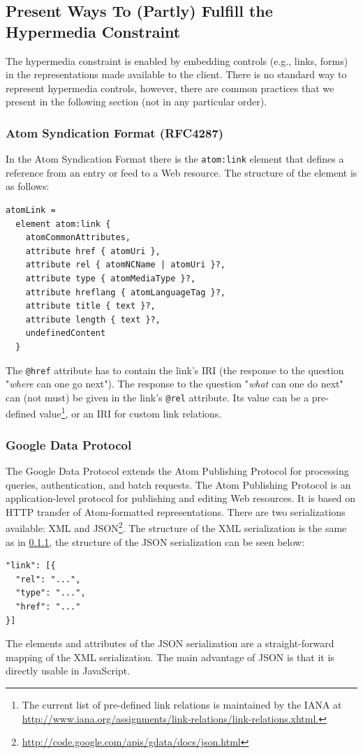 \documentclass{acm_proc_article-sp}
\begin{document}
\subsection{Present Ways To (Partly) Fulfill the Hypermedia Constraint}\label{sec:currenthateoas}
The hypermedia constraint is enabled by embedding controls (e.g., links, forms) in the representations made available to the client. There is no standard way to represent hypermedia controls, however, there are common practices that we present in the following section (not in any particular order).

\subsubsection{Atom Syndication Format (RFC4287)}\label{sec:atom}
In the Atom Syndication Format \cite{Atom:Synd} there is the \texttt{atom:link} element that defines a reference from an entry or feed to a Web resource. The structure of the element is as follows:
\begin{verbatim}
atomLink =
  element atom:link {
    atomCommonAttributes,
    attribute href { atomUri },
    attribute rel { atomNCName | atomUri }?,
    attribute type { atomMediaType }?,
    attribute hreflang { atomLanguageTag }?,
    attribute title { text }?,
    attribute length { text }?,
    undefinedContent
  }
\end{verbatim}
The \texttt{@href} attribute has to contain the link's IRI (the response to the question "\textit{where} can one go next"). The response to the question "\textit{what} can one do next" can (not must) be given in the link's \texttt{@rel} attribute. Its value can be a pre-defined value\footnote{The current list of pre-defined link relations is maintained by the IANA at \url{http://www.iana.org/assignments/link-relations/link-relations.xhtml.}}, or an IRI for custom link relations.

\subsubsection{Google Data Protocol}\label{sec:gdata}
The Google Data Protocol\cite{Google:Data} extends the Atom Publishing Protocol\cite{Atom:Pub} for processing queries, authentication, and batch requests. The Atom Publishing Protocol is an application-level protocol for publishing and editing Web resources. It is based on HTTP transfer of Atom-formatted representations. There are two serializations available: XML and JSON\footnote{\url{http://code.google.com/apis/gdata/docs/json.html}}. The structure of the XML serialization is the same as in \ref{sec:atom}, the structure of the JSON serialization can be seen below:
\begin{verbatim}
"link": [{
  "rel": "...",
  "type": "...",
  "href": "..."
}]
\end{verbatim}
The elements and attributes of the JSON serialization are a straight-forward mapping of the XML serialization. The main advantage of JSON is that it is directly usable in JavaScript.
\end{document}
